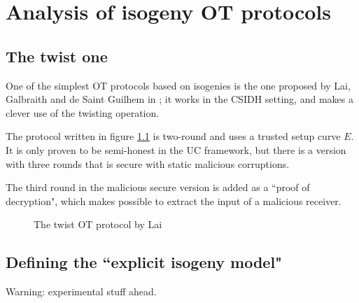 \chapter{Analysis of isogeny OT protocols}

\section{The twist one}
One of the simplest OT protocols based on isogenies is the one proposed by Lai, Galbraith and de Saint Guilhem in \cite{Lai_twists}; it works in the CSIDH setting, and makes a clever use of the twisting operation.

The protocol written in figure \ref{prot_twist} is two-round and uses a trusted setup curve $E$. It is only proven to be semi-honest in the UC framework, but there is a version with three rounds that is secure with static malicious corruptions.

The third round in the malicious secure version is added as a ``proof of decryption", which makes possible to extract the input of a malicious receiver.

\begin{figure}
    \caption{The twist OT protocol by Lai}
    \label{prot_twist}
\end{figure}


\section{Defining the ``explicit isogeny model"}
Warning: experimental stuff ahead.

